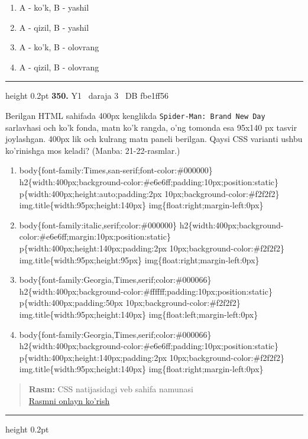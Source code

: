 \documentclass[10pt,a4paper,oneside]{article}
\begin{document}
\begin{enumerate}[label=\Alph*),leftmargin=9mm]
\item A - ko'k, B - yashil
\item A - qizil, B - yashil
\item A - ko'k, B - olovrang
\item A - qizil, B - olovrang
\end{enumerate}
\vspace{2mm}\hrule height 0.2pt \vspace{4mm}
\hypertarget{q350}{\textbf{\color{ink}350.}}  {\color{muted}\scriptsize Y1 \textbullet\ daraja 3 \textbullet\ DB fbe1ff56}
\par
Berilgan HTML sahifada 400px kenglikda \texttt{Spider-Man: Brand New Day} sarlavhasi och ko'k fonda, matn ko'k rangda, o'ng tomonda esa 95x140 px tasvir joylashgan. 400px lik och kulrang matn paneli berilgan. Qaysi CSS varianti ushbu ko'rinishga mos keladi? (Manba: 21-22-rasmlar.)
\begin{enumerate}[label=\Alph*),leftmargin=9mm]
\item body\{font-family:Times,san-serif;font-color:\#000000\} h2\{width:400px;background-color:\#e6e6ff;padding:10px;position:static\} p\{width:400px;height:auto;padding:2px 10px;background-color:\#f2f2f2\} img.title\{width:95px;height:140px\} img\{float:right;margin-left:0px\}
\item body\{font-family:italic,serif;color:\#000000\} h2\{width:400px;background-color:\#e6e6ff;margin:10px;position:static\} p\{width:400px;height:140px;padding:2px 10px;background-color:\#f2f2f2\} img.title\{width:95px;height:95px\} img\{float:right;margin-left:0px\}
\item body\{font-family:Georgia,Times,serif;color:\#000066\} h2\{width:400px;background-color:\#ffffff;padding:10px;position:static\} p\{width:400px;padding:50px 10px;background-color:\#f2f2f2\} img.title\{width:95px;height:140px\} img\{float:left;margin-left:0px\}
\item body\{font-family:Georgia,Times,serif;color:\#000066\} h2\{width:400px;background-color:\#e6e6ff;padding:10px;position:static\} p\{width:400px;height:140px;padding:2px 10px;background-color:\#f2f2f2\} img.title\{width:95px;height:140px\} img\{float:right;margin-left:0px\}
\end{enumerate}
\begin{quote}\footnotesize\color{muted}\textbf{Rasm:} CSS natijasidagi veb sahifa namunasi\\
\href{https://github.com/sarvar9417/attestatsiya/blob/main/public/kuzgi-demo/demo_q21_css.svg}{Rasmni onlayn ko'rish}
\end{quote}
\vspace{2mm}\hrule height 0.2pt \vspace{4mm}
\end{document}
